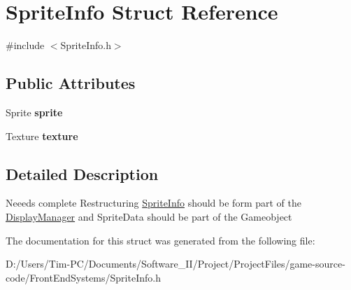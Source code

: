 \hypertarget{struct_sprite_info}{}\section{Sprite\+Info Struct Reference}
\label{struct_sprite_info}


{\ttfamily \#include $<$Sprite\+Info.\+h$>$}

\subsection*{Public Attributes}
\begin{DoxyCompactItemize}
\item 
\mbox{\label{struct_sprite_info_a0cbb7ab027f95f8b936eaaa021d51ce9}} 
Sprite {\bfseries sprite}
\item 
\mbox{\label{struct_sprite_info_a29a5ebd0f1e39394af99bee4658b2b8a}} 
Texture {\bfseries texture}
\end{DoxyCompactItemize}


\subsection{Detailed Description}
Neeeds complete Restructuring \hyperlink{struct_sprite_info}{Sprite\+Info} should be form part of the \hyperlink{class_display_manager}{Display\+Manager} and Sprite\+Data should be part of the Gameobject 

The documentation for this struct was generated from the following file\+:\begin{DoxyCompactItemize}
\item 
D\+:/\+Users/\+Tim-\/\+P\+C/\+Documents/\+Software\+\_\+\+I\+I/\+Project/\+Project\+Files/game-\/source-\/code/\+Front\+End\+Systems/Sprite\+Info.\+h\end{DoxyCompactItemize}
